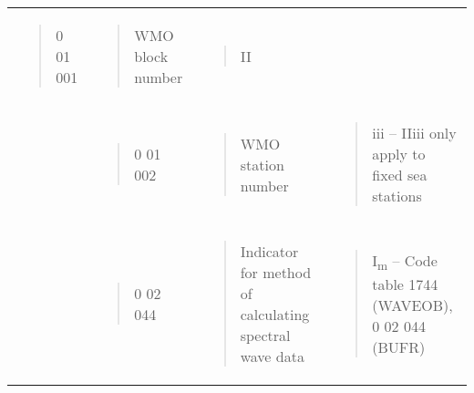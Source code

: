\begin{longtable}[]{@{}llll@{}}
\begin{minipage}[t]{0.22\columnwidth}
\begin{quote}
0 01 001
\end{quote}\strut
\end{minipage} & \begin{minipage}[t]{0.22\columnwidth}\raggedright
\begin{quote}
WMO block number
\end{quote}\strut
\end{minipage} & \begin{minipage}[t]{0.22\columnwidth}\raggedright
\begin{quote}
II
\end{quote}\strut
\end{minipage}\tabularnewline
\begin{minipage}[t]{0.22\columnwidth}\raggedright
\strut
\end{minipage} & \begin{minipage}[t]{0.22\columnwidth}\raggedright
\begin{quote}
0 01 002
\end{quote}\strut
\end{minipage} & \begin{minipage}[t]{0.22\columnwidth}\raggedright
\begin{quote}
WMO station number
\end{quote}\strut
\end{minipage} & \begin{minipage}[t]{0.22\columnwidth}\raggedright
\begin{quote}
iii -- IIiii only apply to fixed sea stations
\end{quote}\strut
\end{minipage}\tabularnewline
\begin{minipage}[t]{0.22\columnwidth}\raggedright
\strut
\end{minipage} & \begin{minipage}[t]{0.22\columnwidth}\raggedright
\begin{quote}
0 02 044
\end{quote}\strut
\end{minipage} & \begin{minipage}[t]{0.22\columnwidth}\raggedright
\begin{quote}
Indicator for method of calculating spectral wave data
\end{quote}\strut
\end{minipage} & \begin{minipage}[t]{0.22\columnwidth}\raggedright
\begin{quote}
I\textsubscript{m} -- Code table 1744 (WAVEOB), 0 02 044 (BUFR)

\end{quote}
\end{minipage}
\end{longtable}
